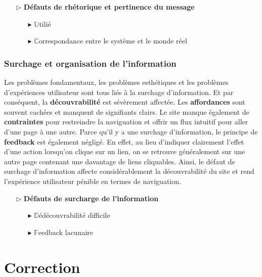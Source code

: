 \documentclass[9pt]{report}
\begin{document}
\begin{multicols*}{2}
  \begin{itemize}
    \item [$\rhd$ ] \textbf{Défauts de rhétorique et pertinence du message}  
      \begin{itemize}
        \item [$\blacktriangleright$ ] $\mathbb{U}$tilié
        \item [$\blacktriangleright$ ] $\mathbb{C}$orrespondance entre le système et le monde réel
      \end{itemize}
  \end{itemize}

  \subsection{Surchage et organisation de l'information} 
  Les problèmes fondamentaux, les problèmes esthétiques et 
  les problèmes d'expériences utilisateur sont tous 
  liés à la surchage d'information.  Et par conséquent, la 
  \textbf{découvrabilité} est sévèrement affectée. 
  Les \textbf{affordances} sont souvent cachées et manquent 
  de signifiants clairs. Le site manque également de 
  \textbf{contraintes} pour restreindre la naviguation et 
  offrir un flux intuitif pour aller d'une page à une autre. Parce qu'il 
  y a une surchage d'information, le principe de \textbf{feedback} est 
  également négligé. En effet, au lieu d'indiquer clairement 
  l'effet d'une action lorsqu'on clique sur un lien, on 
  se retrouve généralement sur une autre page contenant 
  une davantage de liens cliquables. Ainsi, le défaut de surchage 
  d'information affecte considérablement la découvrabilité 
  du site et rend l'expérience utilisateur pénible en termes de 
  naviguation. 


  \begin{itemize}
    \item [$\rhd$ ] \textbf{Défauts de surcharge de l'information}  
      \begin{itemize}
        \item [$\blacktriangleright$ ] $\mathbb{D}$édécouvrabilité difficile
        \item [$\blacktriangleright$ ] $\mathbb{F}$eedback lacunaire
      \end{itemize}
  \end{itemize}

  \chapter{Correction}


\end{multicols*}
\end{document}
